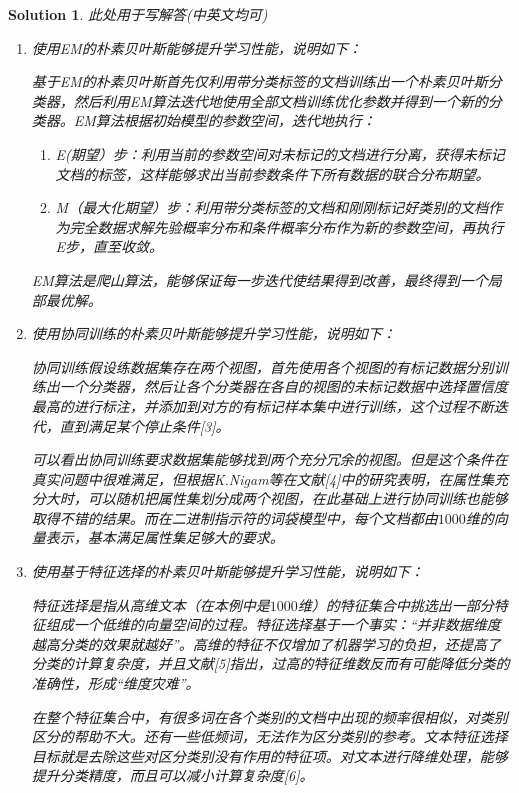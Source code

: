 \documentclass[a4paper,UTF8]{article}
\numberwithin{equation}{section}
\newtheorem*{solution}{Solution}
\begin{document}
\begin{solution}
此处用于写解答(中英文均可)
	\begin{enumerate}
		\item 使用EM的朴素贝叶斯能够提升学习性能，说明如下：

		基于EM的朴素贝叶斯首先仅利用带分类标签的文档训练出一个朴素贝叶斯分类器，然后利用EM算法迭代地使用全部文档训练优化参数并得到一个新的分类器。EM算法根据初始模型的参数空间，迭代地执行：
		\begin{enumerate}[(1)]
			\item E(期望）步：利用当前的参数空间对未标记的文档进行分离，获得未标记文档的标签，这样能够求出当前参数条件下所有数据的联合分布期望。
			\item M（最大化期望）步：利用带分类标签的文档和刚刚标记好类别的文档作为完全数据求解先验概率分布和条件概率分布作为新的参数空间，再执行E步，直至收敛。
		\end{enumerate}

		EM算法是爬山算法，能够保证每一步迭代使结果得到改善，最终得到一个局部最优解。

		\item 使用协同训练的朴素贝叶斯能够提升学习性能，说明如下：

		协同训练假设练数据集存在两个视图，首先使用各个视图的有标记数据分别训练出一个分类器，然后让各个分类器在各自的视图的未标记数据中选择置信度最高的进行标注，并添加到对方的有标记样本集中进行训练，这个过程不断迭代，直到满足某个停止条件[3]。

		可以看出协同训练要求数据集能够找到两个充分冗余的视图。但是这个条件在真实问题中很难满足，但根据K.Nigam等在文献[4]中的研究表明，在属性集充分大时，可以随机把属性集划分成两个视图，在此基础上进行协同训练也能够取得不错的结果。而在二进制指示符的词袋模型中，每个文档都由$1000$维的向量表示，基本满足属性集足够大的要求。
		\item 使用基于特征选择的朴素贝叶斯能够提升学习性能，说明如下：

		特征选择是指从高维文本（在本例中是$1000$维）的特征集合中挑选出一部分特征组成一个低维的向量空间的过程。特征选择基于一个事实：“并非数据维度越高分类的效果就越好”。高维的特征不仅增加了机器学习的负担，还提高了分类的计算复杂度，并且文献[5]指出，过高的特征维数反而有可能降低分类的准确性，形成“维度灾难”。

		在整个特征集合中，有很多词在各个类别的文档中出现的频率很相似，对类别区分的帮助不大。还有一些低频词，无法作为区分类别的参考。文本特征选择目标就是去除这些对区分类别没有作用的特征项。对文本进行降维处理，能够提升分类精度，而且可以减小计算复杂度[6]。


	\end{enumerate}
\end{solution}
\newpage
\end{document}
